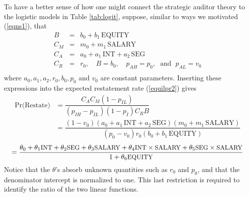 To have a better sense of how one might connect the strategic auditor theory to the
logistic models in Table \ref{tab:logit}, suppose, similar to ways we motivated (\ref{eqns1}), that 
\begin{equation}\begin{array}{lcl}\label{eqns2}
B & = & b_0 + b_1 \, \mbox{EQUITY} \\[.5em]
C_M & = & m_0 + m_1 \, \mbox{SALARY} \\[.5em]
C_A & = & a_0 + a_1 \, \mbox{INT} + a_2 \, \mbox{SEG}\\[.5em]
C_R & = & r_0, \quad B  =  b_0, \quad p_{AH}   =  p_0, \; \mbox{ and } \; p_{AL}  =  v_0 \\[.5em]
\end{array}
\end{equation}
where $ a_0, a_1, a_2, r_0, b_0, p_0$ and $v_0$ are constant parameters. 
Inserting these expressions into the expected restatement rate (\ref{equilpr2}) gives
\begin{align*} \label{equilpr3}
\mbox{Pr(Restate)} & =   \dfrac{C_AC_M(1-p_{IL})}{(p_{IH}-p_{IL})(1-p_I)C_RB} \\
&= \dfrac{(1-v_0)(a_0 + a_1 \, \mbox{INT} + a_2 \, \mbox{SEG})(m_0 + m_1 \, \mbox{SALARY})}
{(p_0-v_0)r_0(b_0 + b_1 \, \mbox{EQUITY})}
\end{align*}
\begin{equation}\label{equilpr4}
 =  \dfrac{\theta_0 + \theta_1\mbox{\small INT} + \theta_2\mbox{\small SEG} + \theta_3\mbox{\small SALARY}
+ \theta_4\mbox{\small INT} \times \mbox{\small SALARY}+ \theta_5\mbox{\small SEG} \times \mbox{\small SALARY}}
{1 +  \theta_6\mbox{\small EQUITY}}
\end{equation}
Notice that the $\theta$'s absorb unknown quantities such as $r_0$ and $p_0$, and that the denominator intercept
is normalized to one. This last restriction is required to identify the ratio of the two linear functions.

